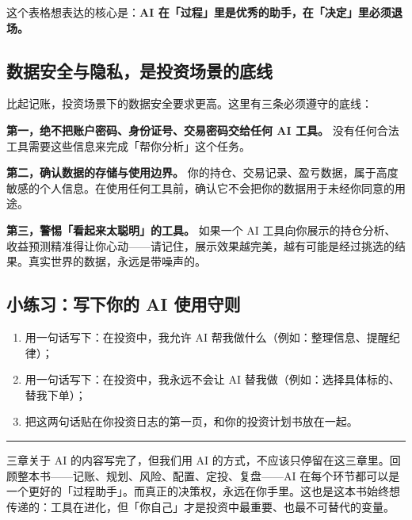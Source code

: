 \documentclass[a4paper,11pt,oneside,fontset=none,UTF8,zihao=-4]{ctexbook}
\providecommand{\tightlist}{\setlength{\itemsep}{2pt}\setlength{\parskip}{1pt}}
\begin{document}
这个表格想表达的核心是：\textbf{AI
在「过程」里是优秀的助手，在「决定」里必须退场。}

\subsection{数据安全与隐私，是投资场景的底线}\label{ux6570ux636eux5b89ux5168ux4e0eux9690ux79c1ux662fux6295ux8d44ux573aux666fux7684ux5e95ux7ebf}

比起记账，投资场景下的数据安全要求更高。这里有三条必须遵守的底线：

\textbf{第一，绝不把账户密码、身份证号、交易密码交给任何 AI 工具。}
没有任何合法工具需要这些信息来完成「帮你分析」这个任务。

\textbf{第二，确认数据的存储与使用边界。}
你的持仓、交易记录、盈亏数据，属于高度敏感的个人信息。在使用任何工具前，确认它不会把你的数据用于未经你同意的用途。

\textbf{第三，警惕「看起来太聪明」的工具。} 如果一个 AI
工具向你展示的持仓分析、收益预测精准得让你心动------请记住，展示效果越完美，越有可能是经过挑选的结果。真实世界的数据，永远是带噪声的。

\subsection{小练习：写下你的 AI
使用守则}\label{ux5c0fux7ec3ux4e60ux5199ux4e0bux4f60ux7684-ai-ux4f7fux7528ux5b88ux5219}

\begin{enumerate}
\def\labelenumi{\arabic{enumi}.}
\tightlist
\item
  用一句话写下：在投资中，我允许 AI
  帮我做什么（例如：整理信息、提醒纪律）；
\item
  用一句话写下：在投资中，我永远不会让 AI
  替我做（例如：选择具体标的、替我下单）；
\item
  把这两句话贴在你投资日志的第一页，和你的投资计划书放在一起。
\end{enumerate}

\begin{center}{\color{dh-bronze}\rule{0.2\textwidth}{0.5pt}}\end{center}

三章关于 AI 的内容写完了，但我们用 AI
的方式，不应该只停留在这三章里。回顾整本书------记账、规划、风险、配置、定投、复盘------AI
在每个环节都可以是一个更好的「过程助手」。而真正的决策权，永远在你手里。这也是这本书始终想传递的：工具在进化，但「你自己」才是投资中最重要、也最不可替代的变量。

\newpage
\end{document}
